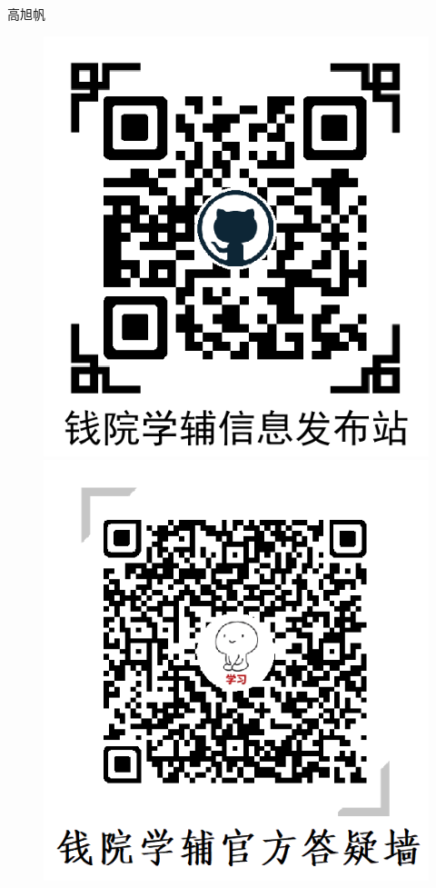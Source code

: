 \documentclass[b5paper,opensource]{qyxf-book}%
\begin{document}
\begin{flushright}
	高旭帆
\end{flushright}
\vspace{1.0cm}
\begin{figure}[!h]
	\centering
	\begin{minipage}[c]{0.5\textwidth}
		\centering
		\includegraphics[scale=0.5]{qrcode2.png}
	\end{minipage}%
	\begin{minipage}[c]{0.5\textwidth}
		\centering
		\includegraphics[scale=0.5]{qxf.png}
	\end{minipage}
\end{figure}



\newpage
\tableofcontents
\setlength{\parindent}{0pt}

\newpage

\newpage
\end{document}
